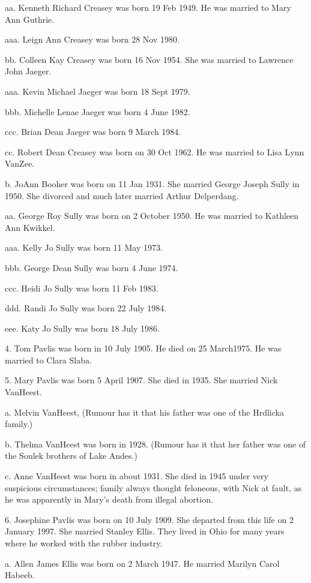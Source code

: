 \documentclass[a4paper]{article}
\begin{document}
aa. Kenneth Richard Creasey was born 19 Feb 1949.  He was married to Mary Ann Guthrie.

aaa. Leign Ann Creasey was born 28 Nov 1980.

bb. Colleen Kay Creasey was born 16 Nov 1954.  She was married to Lawrence John Jaeger.

aaa. Kevin Michael Jaeger was born 18 Sept 1979.

bbb. Michelle Lenae Jaeger was born 4 June 1982.

ccc. Brian Dean Jaeger was born 9 March 1984.
					
cc. Robert Dean Creasey was born on 30 Oct 1962.  He was married to Lisa Lynn VanZee.

b. JoAnn Booher was born on 11 Jan 1931.  She married George Joseph Sully in 1950.  She divorced and much later married Arthur Delperdang.

aa. George Roy Sully was born on 2 October 1950.  He was married to Kathleen Ann Kwikkel.

aaa. Kelly Jo Sully was born 11 May 1973.

bbb. George Dean Sully was born 4 June 1974.

ccc. Heidi Jo Sully was born 11 Feb 1983.  

ddd. Randi Jo Sully was born 22 July 1984.

eee. Katy Jo Sully was born 18 July 1986.

4. Tom Pavlis was born in 10 July 1905.  He died on 25 March1975.  He was married to	Clara Slaba.   

5. Mary Pavlis was born 5 April 1907.  She died in 1935.  She married Nick VanHeest. 
 
a.  Melvin VanHeest, (Rumour has it that his father was one of the Hrdlicka family.)  

b. Thelma VanHeest was born in 1928. (Rumour has it that her father was one of the Soulek brothers of Lake Andes.)

c. Anne VanHeest was born in about 1931.  She died in 1945 under very suspicious circumstances; family  always thought feloneous, with Nick at fault, as he was apparently in Mary's death from illegal abortion.   

6. Josephine Pavlis was born on 10 July 1909. She departed from this life on 2 January 1997.  She married Stanley Ellis.  They lived in Ohio for many  years where he worked with the rubber industry. 

a. Allen James Ellis was born on 2 March 1947.  He married Marilyn Carol Habeeb.
\end{document}
